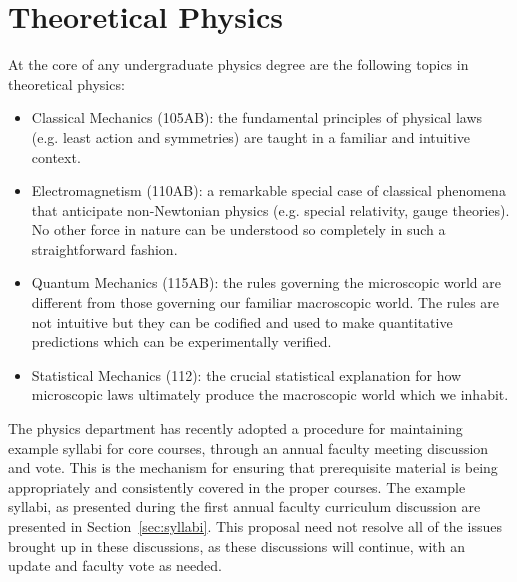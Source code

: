 \documentclass[12pt]{article}
\begin{document}
\section{Theoretical Physics}
\label{sec:theory}

At the core of any undergraduate physics degree are the following
topics in theoretical physics:
\begin{itemize}
\item Classical Mechanics (105AB): the fundamental principles of physical laws
  (e.g. least action and symmetries) are taught in a familiar and
  intuitive context. 
\item Electromagnetism (110AB): a remarkable special case of classical
  phenomena that anticipate non-Newtonian physics (e.g. special
  relativity, gauge theories).  No other force in nature can be understood so
  completely in such a straightforward fashion.  
\item Quantum Mechanics (115AB): the rules governing the microscopic world are
  different from those governing our familiar macroscopic world.  The
  rules are not intuitive but they can be codified and used to make
  quantitative predictions which can be experimentally verified.
\item Statistical Mechanics (112): the crucial statistical explanation for how
  microscopic laws ultimately produce the macroscopic world which we inhabit.
\end{itemize}

The physics department has recently adopted a procedure for
maintaining example syllabi for core courses, through an annual
faculty meeting discussion and vote.  This is the mechanism for
ensuring that prerequisite material is being appropriately and
consistently covered in the proper courses.  The example syllabi, as
presented during the first annual faculty curriculum discussion are
presented in Section~\ref{sec:syllabi}.  This proposal need not
resolve all of the issues brought up in these discussions, as these
discussions will continue, with an update and faculty vote as needed.
\end{document}
